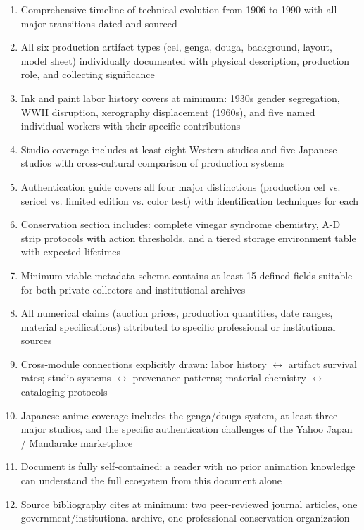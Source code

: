 \documentclass[11pt,letterpaper]{article}
\begin{document}
\begin{enumerate}
  \item Comprehensive timeline of technical evolution from 1906 to 1990 with all major transitions dated and sourced
  \item All six production artifact types (cel, genga, douga, background, layout, model sheet) individually documented with physical description, production role, and collecting significance
  \item Ink and paint labor history covers at minimum: 1930s gender segregation, WWII disruption, xerography displacement (1960s), and five named individual workers with their specific contributions
  \item Studio coverage includes at least eight Western studios and five Japanese studios with cross-cultural comparison of production systems
  \item Authentication guide covers all four major distinctions (production cel vs. sericel vs. limited edition vs. color test) with identification techniques for each
  \item Conservation section includes: complete vinegar syndrome chemistry, A-D strip protocols with action thresholds, and a tiered storage environment table with expected lifetimes
  \item Minimum viable metadata schema contains at least 15 defined fields suitable for both private collectors and institutional archives
  \item All numerical claims (auction prices, production quantities, date ranges, material specifications) attributed to specific professional or institutional sources
  \item Cross-module connections explicitly drawn: labor history $\leftrightarrow$ artifact survival rates; studio systems $\leftrightarrow$ provenance patterns; material chemistry $\leftrightarrow$ cataloging protocols
  \item Japanese anime coverage includes the genga/douga system, at least three major studios, and the specific authentication challenges of the Yahoo Japan / Mandarake marketplace
  \item Document is fully self-contained: a reader with no prior animation knowledge can understand the full ecosystem from this document alone
  \item Source bibliography cites at minimum: two peer-reviewed journal articles, one government/institutional archive, one professional conservation organization
\end{enumerate}
\end{document}
